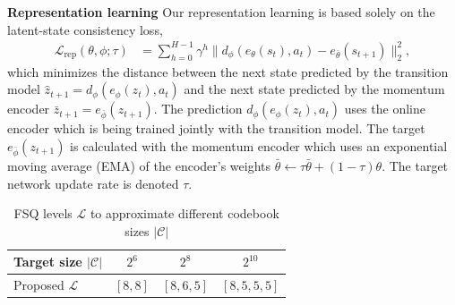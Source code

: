\documentclass{article}
\theoremstyle{plain}
\theoremstyle{definition}
\theoremstyle{remark}
\newcommand{\E}{\mathbb{E}}
\begin{document}
\textbf{Representation learning}
Our representation learning is based solely on the latent-state consistency loss,
%
\begin{align} \label{eq:rep-loss}
  \mathcal{L}_{\text{rep}}(\theta, \phi; \tau)
&= \sum_{h=0}^{H-1} \gamma^{h} \| d_{\phi}(e_{\theta}(s_{t}), a_{t}) - e_{\bar{\theta}}(s_{t+1}) \|_{2}^{2},
\end{align}
%
which minimizes the distance between the next state predicted by the transition model $\hat{z}_{t+1} = d_{\phi}(e_{\phi}(z_{t}), a_{t})$
and the next state predicted by the momentum encoder $\bar{z}_{t+1} = e_{\bar{\phi}}(z_{t+1})$.
The prediction $d_{\phi}(e_{\phi}(z_{t}), a_{t})$ uses the online encoder which is being trained jointly with the transition model.
The target $e_{\bar{\phi}}(z_{t+1})$ is calculated with the momentum encoder which uses an exponential moving average (EMA)
of the encoder's weights $\bar{\theta} \leftarrow \tau \bar{\theta} + (1-\tau)\theta$.
The target network update rate is denoted $\tau$.

\begin{table}[t]
\caption{FSQ levels $\mathcal{L}$ to approximate different codebook sizes $|\mathcal{C}|$}
\label{tab:fsq-levels}
\vskip 0.15in
\begin{center}
\begin{small}
\begin{sc}
\begin{tabular}{lccc}
\toprule
Target size $|\mathcal{C}|$ & $2^{6}$ & $2^{8}$ & $2^{10}$ \\
\midrule
Proposed $\mathcal{L}$ & $[8,8]$ & $[8,6,5]$ & $[8,5,5,5]$ \\
\bottomrule
\end{tabular}
\end{sc}
\end{small}
\end{center}
\vskip -0.1in
\end{table}
\end{document}
